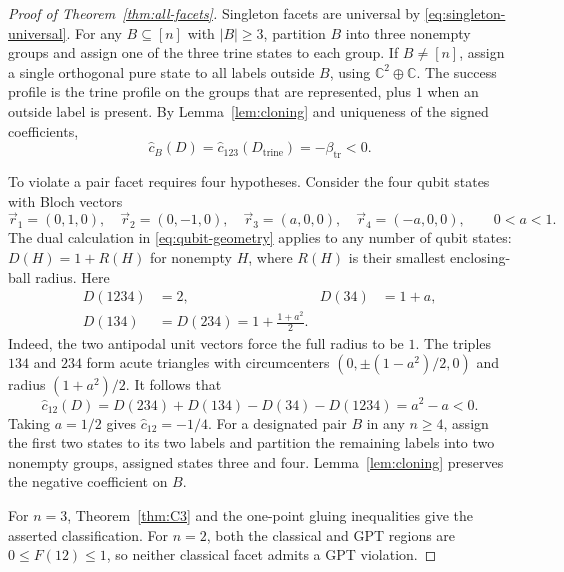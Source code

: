\documentclass[a4paper,11pt,onecolumn,unpublished]{quantumarticle}
\theoremstyle{definition}
\newcommand{\1}{\mathbf 1}
\newcommand{\btr}{\beta_{\mathrm{tr}}}
\begin{document}
\begin{proof}[Proof of Theorem~\ref{thm:all-facets}]
Singleton facets are universal by \eqref{eq:singleton-universal}. For any
$B\subseteq[n]$ with $|B|\ge3$, partition $B$ into three nonempty groups and
assign one of the three trine states to each group. If $B\ne[n]$, assign a
single orthogonal pure state to all labels outside $B$, using
$\mathbb C^2\oplus\mathbb C$. The success profile is the trine profile on the
groups that are represented, plus $1$ when an outside label is present.
By Lemma~\ref{lem:cloning} and uniqueness of the signed coefficients,
\begin{equation}\label{eq:trine-lift}
 \widehat c_B(D)=\widehat c_{123}(D_{\mathrm{trine}})=-\btr<0.
\end{equation}

To violate a pair facet requires four hypotheses. Consider the four qubit
states with Bloch vectors
\begin{equation}\label{eq:four-qubit-vectors}
 \vec r_1=(0,1,0),\quad \vec r_2=(0,-1,0),\quad
 \vec r_3=(a,0,0),\quad \vec r_4=(-a,0,0),\qquad 0<a<1.
\end{equation}
The dual calculation in \eqref{eq:qubit-geometry} applies to any number of qubit
states: $D(H)=1+R(H)$ for nonempty $H$, where $R(H)$ is their smallest
enclosing-ball radius. Here
\begin{align}
 D(1234)&=2, & D(34)&=1+a,\nonumber\\
 D(134)&=D(234)=1+\frac{1+a^2}{2}.\label{eq:four-qubit-success}
\end{align}
Indeed, the two antipodal unit vectors force the full radius to be $1$.
The triples $134$ and $234$ form acute triangles with circumcenters
$(0,\pm(1-a^2)/2,0)$ and radius $(1+a^2)/2$. It follows that
\begin{equation}\label{eq:negative-pair}
 \widehat c_{12}(D)
 =D(234)+D(134)-D(34)-D(1234)=a^2-a<0.
\end{equation}
Taking $a=1/2$ gives $\widehat c_{12}=-1/4$.
For a designated pair $B$ in any $n\ge4$, assign the first two states to its
two labels and partition the remaining labels into two nonempty groups,
assigned states three and four. Lemma~\ref{lem:cloning} preserves the negative
coefficient on $B$.

For $n=3$, Theorem~\ref{thm:C3} and the one-point gluing inequalities give the
asserted classification. For $n=2$, both the classical and GPT regions are
$0\le F(12)\le1$, so neither classical facet admits a GPT violation.
\end{proof}
\end{document}
